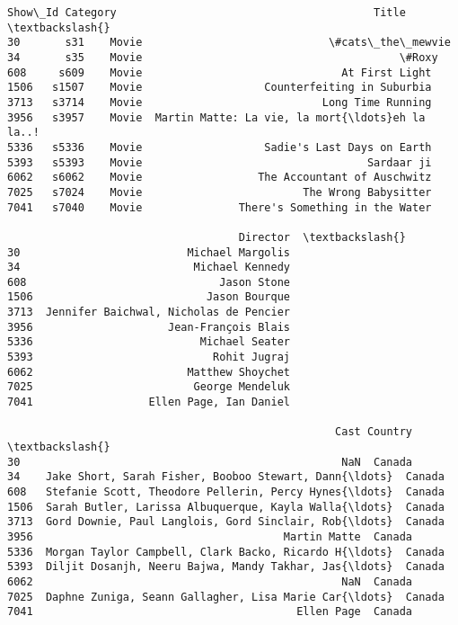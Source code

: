 \documentclass[11pt]{article}
\makeatletter
\newcommand{\boxspacing}{\kern\kvtcb@left@rule\kern\kvtcb@boxsep}
\newcommand{\prompt}[4]{
        {\ttfamily\llap{{\color{#2}[#3]:\hspace{3pt}#4}}\vspace{-\baselineskip}}
    }
\makeatother
\begin{document}
            \begin{tcolorbox}[breakable, size=fbox, boxrule=.5pt, pad at break*=1mm, opacityfill=0]
\prompt{Out}{outcolor}{46}{\boxspacing}
\begin{Verbatim}[commandchars=\\\{\}]
     Show\_Id Category                                        Title  \textbackslash{}
30       s31    Movie                             \#cats\_the\_mewvie
34       s35    Movie                                        \#Roxy
608     s609    Movie                               At First Light
1506   s1507    Movie                   Counterfeiting in Suburbia
3713   s3714    Movie                            Long Time Running
3956   s3957    Movie  Martin Matte: La vie, la mort{\ldots}eh la la..!
5336   s5336    Movie                   Sadie's Last Days on Earth
5393   s5393    Movie                                   Sardaar ji
6062   s6062    Movie                  The Accountant of Auschwitz
7025   s7024    Movie                         The Wrong Babysitter
7041   s7040    Movie               There's Something in the Water

                                    Director  \textbackslash{}
30                          Michael Margolis
34                           Michael Kennedy
608                              Jason Stone
1506                           Jason Bourque
3713  Jennifer Baichwal, Nicholas de Pencier
3956                     Jean-François Blais
5336                          Michael Seater
5393                            Rohit Jugraj
6062                        Matthew Shoychet
7025                         George Mendeluk
7041                  Ellen Page, Ian Daniel

                                                   Cast Country  \textbackslash{}
30                                                  NaN  Canada
34    Jake Short, Sarah Fisher, Booboo Stewart, Dann{\ldots}  Canada
608   Stefanie Scott, Theodore Pellerin, Percy Hynes{\ldots}  Canada
1506  Sarah Butler, Larissa Albuquerque, Kayla Walla{\ldots}  Canada
3713  Gord Downie, Paul Langlois, Gord Sinclair, Rob{\ldots}  Canada
3956                                       Martin Matte  Canada
5336  Morgan Taylor Campbell, Clark Backo, Ricardo H{\ldots}  Canada
5393  Diljit Dosanjh, Neeru Bajwa, Mandy Takhar, Jas{\ldots}  Canada
6062                                                NaN  Canada
7025  Daphne Zuniga, Seann Gallagher, Lisa Marie Car{\ldots}  Canada
7041                                         Ellen Page  Canada


\end{Verbatim}
\end{tcolorbox}
\end{document}
